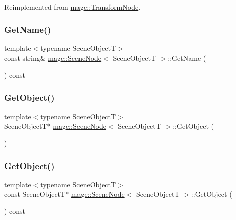 Reimplemented from \hyperlink{classmage_1_1_transform_node_a5029922f6e9287e4693334ea156057ba}{mage\+::\+Transform\+Node}.

\hypertarget{classmage_1_1_scene_node_ab8245744de5c344b52fec0b2679caeb0}{}\label{classmage_1_1_scene_node_ab8245744de5c344b52fec0b2679caeb0} 
\subsubsection{\texorpdfstring{Get\+Name()}{GetName()}}
{\footnotesize\ttfamily template$<$typename Scene\+ObjectT$>$ \\
const string\& \hyperlink{classmage_1_1_scene_node}{mage\+::\+Scene\+Node}$<$ Scene\+ObjectT $>$\+::Get\+Name (\begin{DoxyParamCaption}{ }\end{DoxyParamCaption}) const}

\hypertarget{classmage_1_1_scene_node_a1c5f19002fe2b056673eb3c9dedf1bf1}{}\label{classmage_1_1_scene_node_a1c5f19002fe2b056673eb3c9dedf1bf1} 
\subsubsection{\texorpdfstring{Get\+Object()}{GetObject()}\hspace{0.1cm}{\footnotesize\ttfamily [1/2]}}
{\footnotesize\ttfamily template$<$typename Scene\+ObjectT$>$ \\
Scene\+ObjectT$\ast$ \hyperlink{classmage_1_1_scene_node}{mage\+::\+Scene\+Node}$<$ Scene\+ObjectT $>$\+::Get\+Object (\begin{DoxyParamCaption}{ }\end{DoxyParamCaption})}

\hypertarget{classmage_1_1_scene_node_a9efded16dbe61f16e498246ea3ba9095}{}\label{classmage_1_1_scene_node_a9efded16dbe61f16e498246ea3ba9095} 
\subsubsection{\texorpdfstring{Get\+Object()}{GetObject()}\hspace{0.1cm}{\footnotesize\ttfamily [2/2]}}
{\footnotesize\ttfamily template$<$typename Scene\+ObjectT$>$ \\
const Scene\+ObjectT$\ast$ \hyperlink{classmage_1_1_scene_node}{mage\+::\+Scene\+Node}$<$ Scene\+ObjectT $>$\+::Get\+Object (\begin{DoxyParamCaption}{ }\end{DoxyParamCaption}) const}

